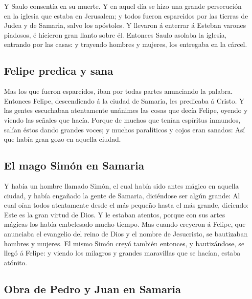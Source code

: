  Y Saulo consentía en su muerte. Y en aquel día se hizo
una grande persecución en la iglesia que estaba en Jerusalem; y todos
fueron esparcidos por las tierras de Judea y de Samaria, salvo los
apóstoles.  Y llevaron á enterrar á Esteban varones
piadosos, é hicieron gran llanto sobre él.  Entonces Saulo
asolaba la iglesia, entrando por las casas: y trayendo hombres y
mujeres, los entregaba en la cárcel.

\hypertarget{felipe-predica-y-sana}{%
\subsection{Felipe predica y sana}\label{felipe-predica-y-sana}}

 Mas los que fueron esparcidos, iban por todas partes
anunciando la palabra.  Entonces Felipe, descendiendo á la
ciudad de Samaria, les predicaba á Cristo.  Y las gentes
escuchaban atentamente unánimes las cosas que decía Felipe, oyendo y
viendo las señales que hacía.  Porque de muchos que tenían
espíritus inmundos, salían éstos dando grandes voces; y muchos
paralíticos y cojos eran sanados:  Así que había gran gozo
en aquella ciudad.

\hypertarget{el-mago-simuxf3n-en-samaria}{%
\subsection{El mago Simón en
Samaria}\label{el-mago-simuxf3n-en-samaria}}

 Y había un hombre llamado Simón, el cual había sido antes
mágico en aquella ciudad, y había engañado la gente de Samaria,
diciéndose ser algún grande:  Al cual oían todos
atentamente desde el más pequeño hasta el más grande, diciendo: Este es
la gran virtud de Dios.  Y le estaban atentos, porque con
sus artes mágicas los había embelesado mucho tiempo.  Mas
cuando creyeron á Felipe, que anunciaba el evangelio del reino de Dios y
el nombre de Jesucristo, se bautizaban hombres y mujeres.
 El mismo Simón creyó también entonces, y bautizándose,
se llegó á Felipe: y viendo los milagros y grandes maravillas que se
hacían, estaba atónito.

\hypertarget{obra-de-pedro-y-juan-en-samaria}{%
\subsection{Obra de Pedro y Juan en
Samaria}\label{obra-de-pedro-y-juan-en-samaria}}

